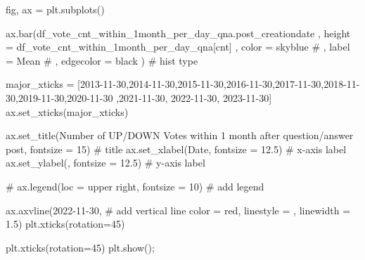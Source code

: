 \documentclass[
  letterpaper,
  DIV=11,
  numbers=noendperiod]{scrartcl}
\newenvironment{Shaded}{\begin{snugshade}}{\end{snugshade}}
\newcommand{\CommentTok}[1]{\textcolor[rgb]{0.37,0.37,0.37}{#1}}
\newcommand{\DecValTok}[1]{\textcolor[rgb]{0.68,0.00,0.00}{#1}}
\newcommand{\FloatTok}[1]{\textcolor[rgb]{0.68,0.00,0.00}{#1}}
\newcommand{\NormalTok}[1]{\textcolor[rgb]{0.00,0.23,0.31}{#1}}
\newcommand{\OperatorTok}[1]{\textcolor[rgb]{0.37,0.37,0.37}{#1}}
\newcommand{\StringTok}[1]{\textcolor[rgb]{0.13,0.47,0.30}{#1}}
\begin{document}
\begin{Shaded}
\begin{Highlighting}[]
\NormalTok{fig, ax }\OperatorTok{=}\NormalTok{ plt.subplots()}


\NormalTok{ax.bar(df\_vote\_cnt\_within\_1month\_per\_day\_qna.post\_creationdate}
\NormalTok{    ,  height }\OperatorTok{=}\NormalTok{ df\_vote\_cnt\_within\_1month\_per\_day\_qna[}\StringTok{\textquotesingle{}cnt\textquotesingle{}}\NormalTok{]}
\NormalTok{    ,  color }\OperatorTok{=} \StringTok{\textquotesingle{}skyblue\textquotesingle{}}
    \CommentTok{\# ,  label = \textquotesingle{}Mean\textquotesingle{}}
    \CommentTok{\# ,  edgecolor = \textquotesingle{}black\textquotesingle{}}
\NormalTok{      ) }\CommentTok{\# hist type}


\NormalTok{major\_xticks }\OperatorTok{=}\NormalTok{ [}\StringTok{\textquotesingle{}2013{-}11{-}30\textquotesingle{}}\NormalTok{,}\StringTok{\textquotesingle{}2014{-}11{-}30\textquotesingle{}}\NormalTok{,}\StringTok{\textquotesingle{}2015{-}11{-}30\textquotesingle{}}\NormalTok{,}\StringTok{\textquotesingle{}2016{-}11{-}30\textquotesingle{}}\NormalTok{,}\StringTok{\textquotesingle{}2017{-}11{-}30\textquotesingle{}}\NormalTok{,}\StringTok{\textquotesingle{}2018{-}11{-}30\textquotesingle{}}\NormalTok{,}\StringTok{\textquotesingle{}2019{-}11{-}30\textquotesingle{}}\NormalTok{,}\StringTok{\textquotesingle{}2020{-}11{-}30\textquotesingle{}}
\NormalTok{                ,}\StringTok{\textquotesingle{}2021{-}11{-}30\textquotesingle{}}\NormalTok{, }\StringTok{\textquotesingle{}2022{-}11{-}30\textquotesingle{}}\NormalTok{, }\StringTok{\textquotesingle{}2023{-}11{-}30\textquotesingle{}}\NormalTok{]}
\NormalTok{ax.set\_xticks(major\_xticks)}

\NormalTok{ax.set\_title(}\StringTok{\textquotesingle{}Number of UP/DOWN Votes within 1 month after question/answer post\textquotesingle{}}\NormalTok{, fontsize }\OperatorTok{=} \DecValTok{15}\NormalTok{) }\CommentTok{\# title}
\NormalTok{ax.set\_xlabel(}\StringTok{\textquotesingle{}Date\textquotesingle{}}\NormalTok{, fontsize }\OperatorTok{=} \FloatTok{12.5}\NormalTok{) }\CommentTok{\# x{-}axis label}
\NormalTok{ax.set\_ylabel(}\StringTok{\textquotesingle{}\textquotesingle{}}\NormalTok{, fontsize }\OperatorTok{=} \FloatTok{12.5}\NormalTok{) }\CommentTok{\# y{-}axis label}

\CommentTok{\# ax.legend(loc = \textquotesingle{}upper right\textquotesingle{}, fontsize = 10) \# add legend}

\NormalTok{ax.axvline(}\StringTok{\textquotesingle{}2022{-}11{-}30\textquotesingle{}}\NormalTok{, }\CommentTok{\# add vertical line}
\NormalTok{           color }\OperatorTok{=} \StringTok{\textquotesingle{}red\textquotesingle{}}\NormalTok{,}
\NormalTok{           linestyle }\OperatorTok{=} \StringTok{\textquotesingle{}{-}{-}\textquotesingle{}}\NormalTok{,}
\NormalTok{           linewidth }\OperatorTok{=} \FloatTok{1.5}\NormalTok{)}
\NormalTok{plt.xticks(rotation}\OperatorTok{=}\DecValTok{45}\NormalTok{)}

\NormalTok{plt.xticks(rotation}\OperatorTok{=}\DecValTok{45}\NormalTok{)}
\NormalTok{plt.show()}\OperatorTok{;}
\end{Highlighting}
\end{Shaded}
\end{document}
